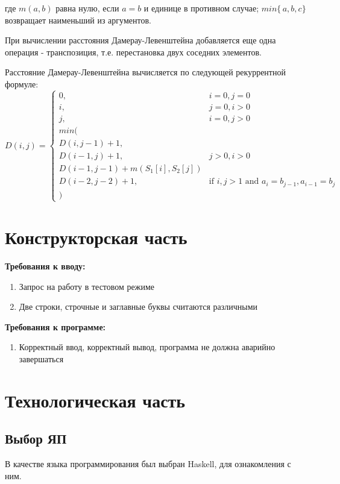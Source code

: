 \documentclass[12pt]{report}
\begin{document}
где $m(a,b)$ равна нулю, если $a=b$ и единице в противном случае; $min\{\,a,b,c\}$ возвращает наименьший из аргументов.

При вычислении расстояния Дамерау-Левенштейна добавляется еще одна операция - транспозиция, т.е. перестановка двух соседних элементов.

Расстояние Дамерау-Левенштейна вычисляется по следующей рекуррентной формуле:
\begin{displaymath}
D(i,j) = \left\{ \begin{array}{ll}
 0, & \textrm{$i = 0, j = 0$}\\
 i, & \textrm{$j = 0, i > 0$}\\
 j, & \textrm{$i = 0, j > 0$}\\
min(\\
D(i,j-1)+1,\\
D(i-1, j) +1, &\textrm{$j>0, i>0$}\\
D(i-1, j-1) + m(S_{1}[i], S_{2}[j])\\
D(i-2, j-2) + 1, &\textrm{if $i,j>1$ and $a_{i} = b_{j-1},a_{i-1}=b_{j} $}\\
)
  \end{array} \right.
\end{displaymath}

\chapter{Конструкторская часть}
\textbf{Требования к вводу:}
\begin{enumerate}
	\item Запрос на работу в тестовом режиме
  	\item Две строки, строчные и заглавные буквы считаются различными
\end{enumerate}
\textbf{Требования к программе:}
\begin{enumerate}
  	\item Корректный ввод, корректный вывод, программа не должна аварийно завершаться
\end{enumerate}

\begin{tikzpicture}[node distance = 2cm, auto]
	
\end{tikzpicture}


\chapter{Технологическая часть}
\section{Выбор ЯП}
В качестве языка программирования был выбран Haskell, для ознакомления с ним.
\end{document}

